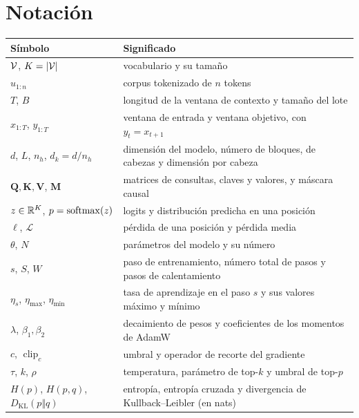 \documentclass[11pt,a4paper,twoside,openany]{book}
\newcommand{\clip}{\operatorname{clip}}
\newcommand{\KL}{D_{\mathrm{KL}}}
\newcommand{\Qm}{\bm{Q}}
\newcommand{\Km}{\bm{K}}
\newcommand{\Vm}{\bm{V}}
\newcommand{\Mm}{\bm{M}}
\begin{document}
\section*{Notación}
\begin{center}\small
\begin{tabularx}{\textwidth}{@{}l>{\raggedright\arraybackslash}X@{}}
\toprule
Símbolo & Significado \\
\midrule
$\mathcal{V}$, $K=\lvert\mathcal{V}\rvert$ & vocabulario y su tamaño \\
$u_{1:n}$ & corpus tokenizado de $n$ tokens \\
$T$, $B$ & longitud de la ventana de contexto y tamaño del lote \\
$x_{1:T}$, $y_{1:T}$ & ventana de entrada y ventana objetivo, con $y_t=x_{t+1}$ \\
$d$, $L$, $n_h$, $d_k=d/n_h$ & dimensión del modelo, número de bloques, de cabezas y dimensión por cabeza \\
$\Qm,\Km,\Vm$, $\Mm$ & matrices de consultas, claves y valores, y máscara causal \\
$z\in\mathbb{R}^{K}$, $p=\operatorname{softmax}(z)$ & logits y distribución predicha en una posición \\
$\ell$, $\mathcal{L}$ & pérdida de una posición y pérdida media \\
$\theta$, $N$ & parámetros del modelo y su número \\
$s$, $S$, $W$ & paso de entrenamiento, número total de pasos y pasos de calentamiento \\
$\eta_s$, $\eta_{\max}$, $\eta_{\min}$ & tasa de aprendizaje en el paso $s$ y sus valores máximo y mínimo \\
$\lambda$, $\beta_1,\beta_2$ & decaimiento de pesos y coeficientes de los momentos de AdamW \\
$c$, $\clip_c$ & umbral y operador de recorte del gradiente \\
$\tau$, $k$, $\rho$ & temperatura, parámetro de top-$k$ y umbral de top-$p$ \\
$H(p)$, $H(p,q)$, $\KL(p\Vert q)$ & entropía, entropía cruzada y divergencia de Kullback--Leibler (en nats) \\
\bottomrule
\end{tabularx}
\end{center}

\tableofcontents

\mainmatter






\appendix


\backmatter

\end{document}
